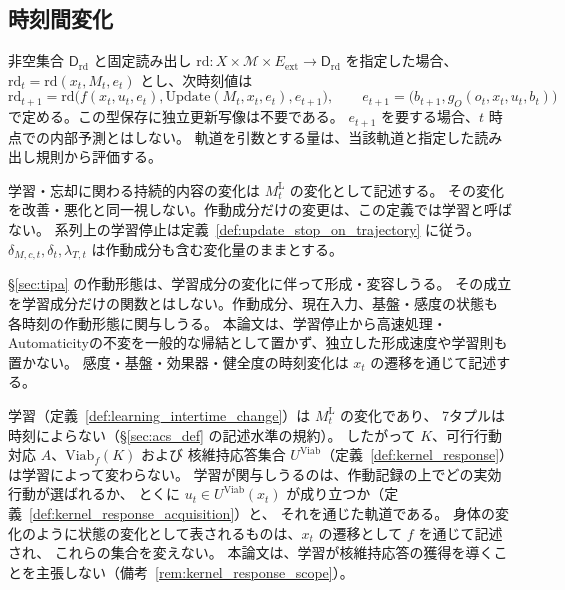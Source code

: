 \subsection{時刻間変化}
\label{subsec:s5_intertime}
\label{subsubsec:intertime_update}
\begin{definition}[担体から誘導される時刻間変化]
\label{def:intertime_update}
非空集合 $\mathsf D_{\mathrm{rd}}$ と固定読み出し
$\mathrm{rd}:X\times\mathcal M\times E_{\mathrm{ext}}\to\mathsf D_{\mathrm{rd}}$ を指定した場合、
$\mathrm{rd}_t=\mathrm{rd}(x_t,M_t,e_t)$ とし、次時刻値は
\[
\mathrm{rd}_{t+1}=\mathrm{rd}\bigl(f(x_t,u_t,e_t),\mathrm{Update}(M_t,x_t,e_t),e_{t+1}\bigr),
\qquad e_{t+1}=\bigl(b_{t+1},g_O(o_t,x_t,u_t,b_t)\bigr)
\]
で定める。この型保存に独立更新写像は不要である。
$e_{t+1}$ を要する場合、$t$ 時点での内部予測とはしない。
軌道を引数とする量は、当該軌道と指定した読み出し規則から評価する。
\end{definition}

\begin{definition}
\label{def:learning_intertime_change}
学習・忘却に関わる持続的内容の変化は $M_t^{\mathrm L}$ の変化として記述する。
その変化を改善・悪化と同一視しない。作動成分だけの変更は、この定義では学習と呼ばない。
系列上の学習停止は定義~\ref{def:update_stop_on_trajectory} に従う。
$\delta_{M,c,t},\delta_t,\lambda_{T,t}$ は作動成分も含む変化量のままとする。
\end{definition}

\begin{remark}
\label{rem:s5_fast_change}
\S\ref{sec:tipa} の作動形態は、学習成分の変化に伴って形成・変容しうる。
その成立を学習成分だけの関数とはしない。作動成分、現在入力、基盤・感度の状態も
各時刻の作動形態に関与しうる。
本論文は、学習停止から高速処理・Automaticityの不変を一般的な帰結として置かず、独立した形成速度や学習則も置かない。
感度・基盤・効果器・健全度の時刻変化は $x_t$ の遷移を通じて記述する。
\end{remark}

\begin{remark}[学習と可行性構造]
\label{rem:s5_learning_viability}
学習（定義~\ref{def:learning_intertime_change}）は $M_t^{\mathrm L}$ の変化であり、
7タプルは時刻によらない（\S\ref{sec:acs_def} の記述水準の規約）。
したがって $K$、可行行動対応 $A$、$\mathrm{Viab}_f(K)$ および
核維持応答集合 $U^{\mathrm{Viab}}$（定義~\ref{def:kernel_response}）は学習によって変わらない。
学習が関与しうるのは、作動記録の上でどの実効行動が選ばれるか、
とくに $u_t\in U^{\mathrm{Viab}}(x_t)$ が成り立つか（定義~\ref{def:kernel_response_acquisition}）と、
それを通じた軌道である。
身体の変化のように状態の変化として表されるものは、$x_t$ の遷移として $f$ を通じて記述され、
これらの集合を変えない。
本論文は、学習が核維持応答の獲得を導くことを主張しない（備考~\ref{rem:kernel_response_scope}）。
\end{remark}

